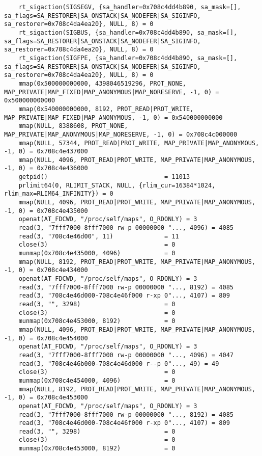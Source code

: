 \documentclass[12pt]{article}
\begin{document}
\begin{verbatim}
	rt_sigaction(SIGSEGV, {sa_handler=0x708c4dd4b890, sa_mask=[], sa_flags=SA_RESTORER|SA_ONSTACK|SA_NODEFER|SA_SIGINFO, sa_restorer=0x708c4da4ea20}, NULL, 8) = 0
	rt_sigaction(SIGBUS, {sa_handler=0x708c4dd4b890, sa_mask=[], sa_flags=SA_RESTORER|SA_ONSTACK|SA_NODEFER|SA_SIGINFO, sa_restorer=0x708c4da4ea20}, NULL, 8) = 0
	rt_sigaction(SIGFPE, {sa_handler=0x708c4dd4b890, sa_mask=[], sa_flags=SA_RESTORER|SA_ONSTACK|SA_NODEFER|SA_SIGINFO, sa_restorer=0x708c4da4ea20}, NULL, 8) = 0
	mmap(0x500000000000, 4398046519296, PROT_NONE, MAP_PRIVATE|MAP_FIXED|MAP_ANONYMOUS|MAP_NORESERVE, -1, 0) = 0x500000000000
	mmap(0x540000000000, 8192, PROT_READ|PROT_WRITE, MAP_PRIVATE|MAP_FIXED|MAP_ANONYMOUS, -1, 0) = 0x540000000000
	mmap(NULL, 8388608, PROT_NONE, MAP_PRIVATE|MAP_ANONYMOUS|MAP_NORESERVE, -1, 0) = 0x708c4c000000
	mmap(NULL, 57344, PROT_READ|PROT_WRITE, MAP_PRIVATE|MAP_ANONYMOUS, -1, 0) = 0x708c4e437000
	mmap(NULL, 4096, PROT_READ|PROT_WRITE, MAP_PRIVATE|MAP_ANONYMOUS, -1, 0) = 0x708c4e436000
	getpid()                                = 11013
	prlimit64(0, RLIMIT_STACK, NULL, {rlim_cur=16384*1024, rlim_max=RLIM64_INFINITY}) = 0
	mmap(NULL, 4096, PROT_READ|PROT_WRITE, MAP_PRIVATE|MAP_ANONYMOUS, -1, 0) = 0x708c4e435000
	openat(AT_FDCWD, "/proc/self/maps", O_RDONLY) = 3
	read(3, "7fff7000-8fff7000 rw-p 00000000 "..., 4096) = 4085
	read(3, "708c4e46d00", 11)              = 11
	close(3)                                = 0
	munmap(0x708c4e435000, 4096)            = 0
	mmap(NULL, 8192, PROT_READ|PROT_WRITE, MAP_PRIVATE|MAP_ANONYMOUS, -1, 0) = 0x708c4e434000
	openat(AT_FDCWD, "/proc/self/maps", O_RDONLY) = 3
	read(3, "7fff7000-8fff7000 rw-p 00000000 "..., 8192) = 4085
	read(3, "708c4e46d000-708c4e46f000 r-xp 0"..., 4107) = 809
	read(3, "", 3298)                       = 0
	close(3)                                = 0
	munmap(0x708c4e453000, 8192)            = 0
	mmap(NULL, 4096, PROT_READ|PROT_WRITE, MAP_PRIVATE|MAP_ANONYMOUS, -1, 0) = 0x708c4e454000
	openat(AT_FDCWD, "/proc/self/maps", O_RDONLY) = 3
	read(3, "7fff7000-8fff7000 rw-p 00000000 "..., 4096) = 4047
	read(3, "708c4e46b000-708c4e46d000 r--p 0"..., 49) = 49
	close(3)                                = 0
	munmap(0x708c4e454000, 4096)            = 0
	mmap(NULL, 8192, PROT_READ|PROT_WRITE, MAP_PRIVATE|MAP_ANONYMOUS, -1, 0) = 0x708c4e453000
	openat(AT_FDCWD, "/proc/self/maps", O_RDONLY) = 3
	read(3, "7fff7000-8fff7000 rw-p 00000000 "..., 8192) = 4085
	read(3, "708c4e46d000-708c4e46f000 r-xp 0"..., 4107) = 809
	read(3, "", 3298)                       = 0
	close(3)                                = 0
	munmap(0x708c4e453000, 8192)            = 0

\end{verbatim}
\end{document}
